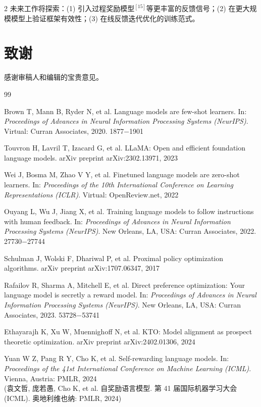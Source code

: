 \documentclass{aas}
\begin{document}
\begin{multicols}{2}
未来工作将探索：(1) 引入过程奖励模型$^{[15]}$等更丰富的反馈信号；(2) 在更大规模模型上验证框架有效性；(3) 在线反馈迭代优化的训练范式。

\section*{致谢}

感谢审稿人和编辑的宝贵意见。

\begin{thebibliography}{99}
 \addtolength{\itemsep}{0.2em} 

 Brown T, Mann B, Ryder N, et al. Language models are few-shot learners. In: {\sl Proceedings of Advances in Neural Information Processing Systems (NeurIPS)}. Virtual: Curran Associates, 2020. 1877$-$1901

 Touvron H, Lavril T, Izacard G, et al. LLaMA: Open and efficient foundation language models. arXiv preprint arXiv:2302.13971, 2023

 Wei J, Bosma M, Zhao V Y, et al. Finetuned language models are zero-shot learners. In: {\sl Proceedings of the 10th International Conference on Learning Representations (ICLR)}. Virtual: OpenReview.net, 2022

 Ouyang L, Wu J, Jiang X, et al. Training language models to follow instructions with human feedback. In: {\sl Proceedings of Advances in Neural Information Processing Systems (NeurIPS)}. New Orleans, LA, USA: Curran Associates, 2022. 27730$-$27744

 Schulman J, Wolski F, Dhariwal P, et al. Proximal policy optimization algorithms. arXiv preprint arXiv:1707.06347, 2017

 Rafailov R, Sharma A, Mitchell E, et al. Direct preference optimization: Your language model is secretly a reward model. In: {\sl Proceedings of Advances in Neural Information Processing Systems (NeurIPS)}. New Orleans, LA, USA: Curran Associates, 2023. 53728$-$53741

 Ethayarajh K, Xu W, Muennighoff N, et al. KTO: Model alignment as prospect theoretic optimization. arXiv preprint arXiv:2402.01306, 2024

 Yuan W Z, Pang R Y, Cho K, et al. Self-rewarding language models. In: {\sl Proceedings of the 41st International Conference on Machine Learning (ICML)}. Vienna, Austria: PMLR, 2024 \\
(袁文哲, 庞若愚, Cho K, et al. 自奖励语言模型. 第 41 届国际机器学习大会 (ICML). 奥地利维也纳: PMLR, 2024)


\end{thebibliography}
\end{multicols}
\end{document}
